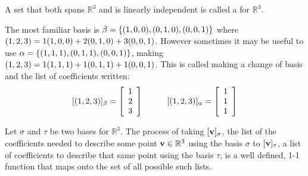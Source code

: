  \begin{defn}
 	A set that both spans $\mathbb{R}^3$ and is linearly independent is called a  for $\mathbb{R}^3$. 
 \end{defn}
 
The most familiar basis is $\beta=\{({1},{0},{0}),({0},{1},{0}),({0},{0},{1})\}$ where $({1},{2},{3})=1({1},{0},{0})+2({0},{1},{0})+3({0},{0},{1})$. However sometimes it may be useful to use $\alpha=\{({1},{1},{1}),({0},{1},{1}),({0},{0},{1})\}$, making $({1},{2},{3})=1({1},{1},{1})+1({0},{1},{1})+1({0},{0},{1})$. This is called making a change of basis and the list of coefficients written:
  \[\begin{array}{ccc}
  [({1 },{2},{3})]_{\beta} =\left[ \begin{array}{c}
  1 \\
  2 \\
  3 \\
  \end{array} \right] & \quad & 
   [({1 },{2},{3})]_{\alpha} =\left[ \begin{array}{c}
   1 \\
   1 \\
   1 \\
   \end{array} \right]
  \end{array} \] 
 
\begin{theorem}
	Let $\sigma$ and  $\tau$ be two bases for $\mathbb{R}^3$. The process of taking $[\mathbf{v}]_\sigma$, the list of the coefficients needed to describe some point $\mathbf{v} \in \mathbb{R}^3$ using the basis $\sigma$ to $[\mathbf{v}]_\tau$, a list of coefficients to describe that same point using the basis $\tau$, is a well defined, 1-1 function that maps onto the set of all possible such lists. 
\end{theorem}
\vspace{-.3in}\hspace{5in}\begin{annotation}
\end{annotation}




